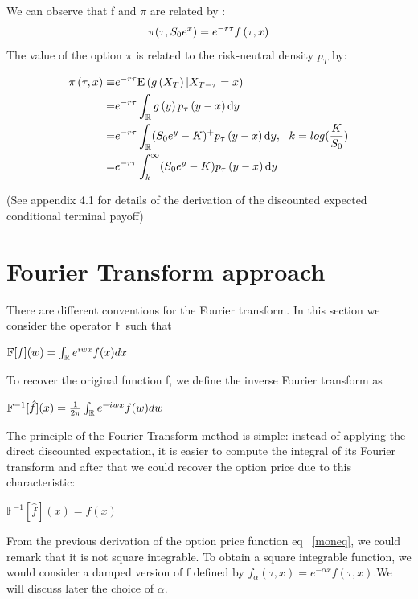 \documentclass[12pt]{report}
\begin{document}
We can observe that f and $ \pi$ are related by :
\begin{gather}
\pi(\tau,S_0 e^x)= e^{-r\tau}f \left( {\tau,x} \right)
\end{gather}
The value of the option $\pi$ is related to the risk-neutral density $p_T$ by:


\begin{align}
\begin{split}
\pi\left( {\tau,x} \right) \equiv & e^{-r\tau}\mathrm{E} \left( {{g \left( {X_T} \right)|X_{T-\tau} = x}} \right)
\\
= &e^{-r\tau}\int_{\mathbb{R}} g\left( {y} \right)  p_\tau \left( {y-x} \right)  \textrm{d} y
\\
=& e^{-r\tau}\int_{\mathbb{R}} (S_0 e^y-K)^+ p_\tau \left( {y-x} \right)  \textrm{d} y, ~~k=log (\frac{K}{S_0})\\
=& e^{-r\tau} \int_k^\infty (S_0 e^y-K) p_\tau \left( {y-x} \right) \textrm{d} y
\label{moneq}
\end{split}
\end{align}


(See appendix 4.1 for details of the derivation of the discounted expected conditional terminal payoff) 

\section{Fourier Transform approach}

There are different conventions for the Fourier transform. In this section we consider the operator
$\mathbb{F}$ such that

\begin{center}

$\mathbb{F}[f](w)= \int_{\mathbb{R}} e^{iwx}f(x) dx $
\end{center}
To recover the original function f, we define the inverse Fourier transform as

\begin{center}
$\mathbb{F}^{-1}[\hat{f}] (x) =\frac{1}{2\pi}\int_{\mathbb{R}} e^{-iwx}f(w) dw $
\end{center}


The principle of the Fourier Transform method is simple: instead of applying the direct discounted expectation, it is easier to compute the integral of its Fourier transform and after that we could recover the option price due to this characteristic:
\begin{center}
$\mathbb{F}^{-1}[\hat{f}] (x)=f(x)$

\end{center} 


From the previous derivation of the option price function eq ~\eqref{moneq}, we could remark that it is not square integrable. To obtain a square integrable function, we would consider a damped version of f defined by $f_{\alpha}(\tau,x) = e^{-\alpha x}f(\tau, x)$.We will discuss later  the choice of $\alpha$.
\end{document}
